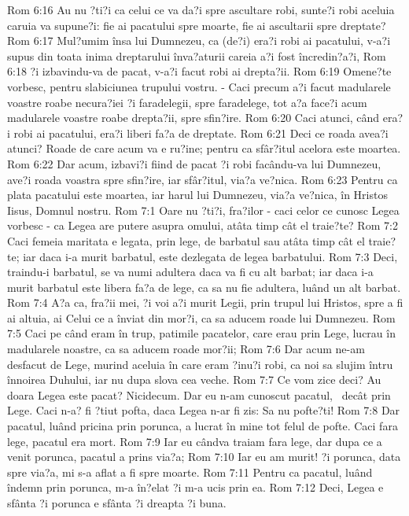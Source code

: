 Rom 6:16  Au nu ?ti?i ca celui ce va da?i spre ascultare robi, sunte?i robi aceluia caruia va supune?i: fie ai pacatului spre moarte, fie ai ascultarii spre dreptate?
Rom 6:17  Mul?umim însa lui Dumnezeu, ca (de?i) era?i robi ai pacatului, v-a?i supus din toata inima dreptarului înva?aturii careia a?i fost încredin?a?i,
Rom 6:18  ?i izbavindu-va de pacat, v-a?i facut robi ai drepta?ii.
Rom 6:19  Omene?te vorbesc, pentru slabiciunea trupului vostru. - Caci precum a?i facut madularele voastre roabe necura?iei ?i faradelegii, spre faradelege, tot a?a face?i acum madularele voastre roabe drepta?ii, spre sfin?ire.
Rom 6:20  Caci atunci, când era?i robi ai pacatului, era?i liberi fa?a de dreptate.
Rom 6:21  Deci ce roada avea?i atunci? Roade de care acum va e ru?ine; pentru ca sfâr?itul acelora este moartea.
Rom 6:22  Dar acum, izbavi?i fiind de pacat ?i robi facându-va lui Dumnezeu, ave?i roada voastra spre sfin?ire, iar sfâr?itul, via?a ve?nica.
Rom 6:23  Pentru ca plata pacatului este moartea, iar harul lui Dumnezeu, via?a ve?nica, în Hristos Iisus, Domnul nostru.
Rom 7:1  Oare nu ?ti?i, fra?ilor - caci celor ce cunosc Legea vorbesc - ca Legea are putere asupra omului, atâta timp cât el traie?te?
Rom 7:2  Caci femeia maritata e legata, prin lege, de barbatul sau atâta timp cât el traie?te; iar daca i-a murit barbatul, este dezlegata de legea barbatului.
Rom 7:3  Deci, traindu-i barbatul, se va numi adultera daca va fi cu alt barbat; iar daca i-a murit barbatul este libera fa?a de lege, ca sa nu fie adultera, luând un alt barbat.
Rom 7:4  A?a ca, fra?ii mei, ?i voi a?i murit Legii, prin trupul lui Hristos, spre a fi ai altuia, ai Celui ce a înviat din mor?i, ca sa aducem roade lui Dumnezeu.
Rom 7:5  Caci pe când eram în trup, patimile pacatelor, care erau prin Lege, lucrau în madularele noastre, ca sa aducem roade mor?ii;
Rom 7:6  Dar acum ne-am desfacut de Lege, murind aceluia în care eram ?inu?i robi, ca noi sa slujim întru înnoirea Duhului, iar nu dupa slova cea veche.
Rom 7:7  Ce vom zice deci? Au doara Legea este pacat? Nicidecum. Dar eu n-am cunoscut pacatul,  decât prin Lege. Caci n-a? fi ?tiut pofta, daca Legea n-ar fi zis: Sa nu pofte?ti!
Rom 7:8  Dar pacatul, luând pricina prin porunca, a lucrat în mine tot felul de pofte. Caci fara lege, pacatul era mort.
Rom 7:9  Iar eu cândva traiam fara lege, dar dupa ce a venit porunca, pacatul a prins via?a;
Rom 7:10  Iar eu am murit! ?i porunca, data spre via?a, mi s-a aflat a fi spre moarte.
Rom 7:11  Pentru ca pacatul, luând îndemn prin porunca, m-a în?elat ?i m-a ucis prin ea.
Rom 7:12  Deci, Legea e sfânta ?i porunca e sfânta ?i dreapta ?i buna.

